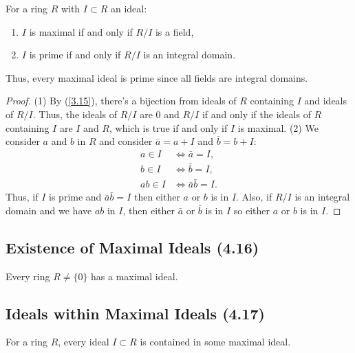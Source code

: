 For a ring $R$ with $I \subset R$ an ideal: \begin{enumerate}
    \item $I$ is maximal if and only if $R / I$ is a field,
    \item $I$ is prime if and only if $R / I$ is an integral domain.
\end{enumerate} Thus, every maximal ideal is prime since all
fields are integral domains.

\begin{proof}
    (1) By (\ref{3.15}), there's a bijection from ideals of $R$
    containing $I$ and ideals of $R / I$. Thus, the ideals of $R / I$
    are $0$ and $R / I$ if and only if the ideals of $R$ containing
    $I$ are $I$ and $R$, which is true if and only if $I$ is maximal.
    \bs
    (2) We consider $a$ and $b$ in $R$ and consider $\bar{a} = a + I$
    and $\bar{b} = b + I$: \begin{align*}
        a \in I &\Longleftrightarrow \bar{a} = I, \\
        b \in I &\Longleftrightarrow \bar{b} = I, \\
        ab \in I &\Longleftrightarrow \bar{a}\bar{b} = I.
    \end{align*} Thus, if $I$ is prime and $\bar{a}\bar{b} = I$ then
    either $a$ or $b$ is in $I$. Also, if $R / I$ is an integral domain
    and we have $ab$ in $I$, then either $\bar{a}$ or $\bar{b}$ is in
    $I$ so either $a$ or $b$ is in $I$.
\end{proof}

\subsection{Existence of Maximal Ideals (4.16)} \label{4.16}

Every ring $R \neq \{0\}$ has a maximal ideal.

\subsection{Ideals within Maximal Ideals (4.17)} \label{4.17}

For a ring $R$, every ideal $I \subset R$ is contained in some
maximal ideal.

